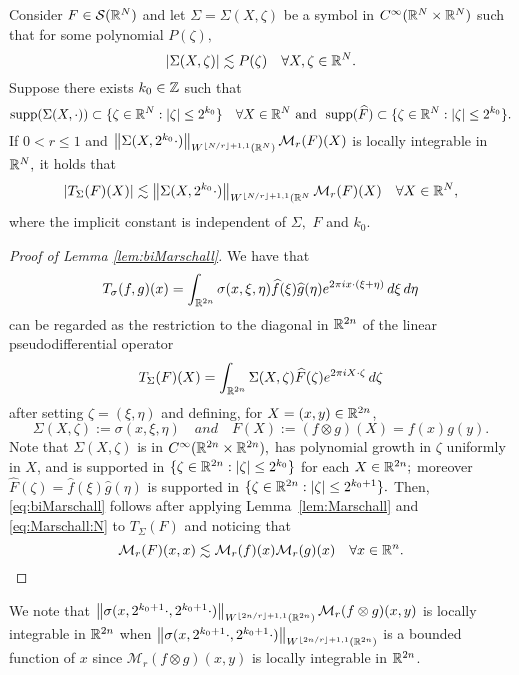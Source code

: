 \begin{lem}\label{lem:Marschall} Consider $F\in \mathcal{S}(\mathbb{R}^N)$ and let $\Sigma=\Sigma(X, \zeta)$ be a  symbol in $C^\infty(\mathbb{R}^N \times \mathbb{R}^N)$ such that for some polynomial $P(\zeta),$
\begin{equation*}\left\vert \Sigma(X, \zeta) \right\vert\lesssim P(\zeta)\quad \forall X,\zeta\in\mathbb{R}^N.
\end{equation*}
Suppose there exists $k_0\in \mathbb{Z}$ such that
$$
{\rm{supp}} (\Sigma(X, \cdot)) \subset  \{ \zeta \in \mathbb{R}^N:  |\zeta| \le 2^{k_0}\}\quad \forall X\in \mathbb{R}^N
\text{ and }\text{ }
{\rm{supp}}(\widehat{F})  \subset  \{ \zeta \in \mathbb{R}^N:  |\zeta| \le 2^{k_0}\}.
$$
If $0<r \le 1$ and $\left\|\Sigma(X, 2^{k_0} \cdot)\right\|_{W^{\left\lfloor N/r \right\rfloor + 1 , 1}(\mathbb{R}^N)} \mathcal{M}_r(F)(X)$ is locally integrable in $\mathbb{R}^N,$ it holds that
\begin{equation}\label{eq:Marschall:N}
|T_{\Sigma}(F)(X)| \lesssim \left\|\Sigma(X, 2^{k_0} \cdot)\right\|_{W^{\left\lfloor N/r \right\rfloor + 1, 1}(\mathbb{R}^N} \mathcal{M}_r(F)(X) \quad \forall X \in \mathbb{R}^N,
\end{equation}
where the implicit constant is independent of $\Sigma,$ $F$ and $k_0.$
\end{lem}

\begin{proof}[Proof of Lemma \ref{lem:biMarschall}]
 We have that
$$
T_{\sigma}(f,g)(x) = \int_{\mathbb{R}^{2n}} \sigma(x, \xi, \eta) \widehat{f}(\xi) \widehat{g}(\eta) e^{2\pi i x \cdot (\xi + \eta)}\, d\xi\, d\eta
$$
can be regarded as the restriction to the diagonal in $\mathbb{R}^{2n}$ of the linear pseudodifferential operator
$$
T_\Sigma(F)(X) = \int_{\mathbb{R}^{2n}} \Sigma(X, \zeta) \widehat{F}(\zeta) e^{2\pi i X \cdot \zeta } \, d\zeta
$$
after setting $\zeta=(\xi, \eta)$ and defining, for $X = (x, y) \in \mathbb{R}^{2n}$, 
$$
\Sigma(X, \zeta) :=\sigma(x, \xi, \eta)\quad and \quad F(X):= (f\otimes g) (X)=f(x)g(y).
$$
Note that $\Sigma(X, \zeta)$ is in $C^\infty(\mathbb{R}^{2n}\times \mathbb{R}^{2n}),$  has polynomial growth in $\zeta$ uniformly in $X$, and  is supported in $\{\zeta\in\mathbb{R}^{2n}: \left\vert \zeta \right\vert\le 2^{k_0}\}$ for each $X\in \mathbb{R}^{2n};$ moreover $\widehat{F}(\zeta) =  \widehat{f}(\xi) \widehat{g}(\eta)$ is supported in $\{\zeta \in \mathbb{R}^{2n}: |\zeta| \leq 2^{k_0+1} \}.$ Then, \eqref{eq:biMarschall} follows after applying Lemma~\ref{lem:Marschall}  and \eqref{eq:Marschall:N} to $T_{\Sigma}(F)$ and noticing that 
\[
\mathcal{M}_r(F)(x, x)\lesssim \mathcal{M}_r(f)(x)\mathcal{M}_r(g)(x)\quad \forall x\in{{\mathbb R}^n}.
\]
\end{proof}

\begin{remark}\label{remark:locint}
We note that $\left\|\sigma(x, 2^{k_0+1} \cdot, 2^{k_0+1} \cdot)\right\|_{W^{\lfloor{2n/r}\rfloor + 1,1}(\mathbb{R}^{2n})} \mathcal{M}_r(f\otimes g)(x,y) $ is locally integrable in $\mathbb{R}^{2n}$ when $\left\|\sigma(x, 2^{k_0+1} \cdot, 2^{k_0+1} \cdot)\right\|_{W^{\lfloor{2n/r}\rfloor + 1,1}(\mathbb{R}^{2n})}$ is a bounded function of $x$ since $\mathcal{M}_r(f\otimes g)(x,y)$ is locally integrable in $\mathbb{R}^{2n}$.
\end{remark}


